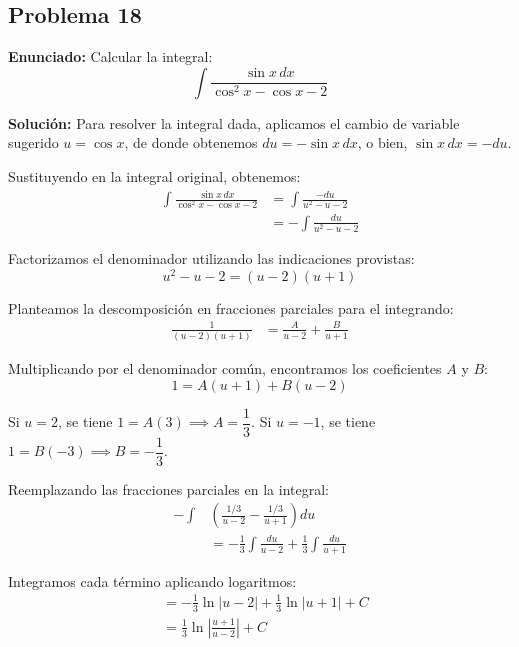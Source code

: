 \subsection*{Problema 18}
\textbf{Enunciado:} Calcular la integral:
\begin{equation*}
\int \frac{\sin x \, dx}{\cos^2 x - \cos x - 2}
\end{equation*}

\textbf{Solución:} Para resolver la integral dada, 
aplicamos el cambio de variable sugerido 
$u = \cos x$, de donde obtenemos 
$du = -\sin x \, dx$, o bien, 
$\sin x \, dx = -du$.

Sustituyendo en la integral original, 
obtenemos:
\begin{align*}
\int \frac{\sin x \, dx}{\cos^2 x - \cos x - 2} 
&= \int \frac{-du}{u^2 - u - 2} \\
&= -\int \frac{du}{u^2 - u - 2}
\end{align*}

Factorizamos el denominador utilizando las 
indicaciones provistas:
\begin{equation*}
u^2 - u - 2 = (u - 2)(u + 1)
\end{equation*}

Planteamos la descomposición en fracciones 
parciales para el integrando:
\begin{align*}
\frac{1}{(u - 2)(u + 1)} 
&= \frac{A}{u - 2} + \frac{B}{u + 1}
\end{align*}

Multiplicando por el denominador común, 
encontramos los coeficientes $A$ y $B$:
\begin{equation*}
1 = A(u + 1) + B(u - 2)
\end{equation*}

Si $u = 2$, se tiene $1 = A(3) \implies A = \dfrac{1}{3}$.
Si $u = -1$, se tiene $1 = B(-3) \implies B = -\dfrac{1}{3}$.

Reemplazando las fracciones parciales en 
la integral:
\begin{align*}
-\int &\left( \frac{1/3}{u - 2} - \frac{1/3}{u + 1} \right) du \\
&= -\frac{1}{3} \int \frac{du}{u - 2} 
+ \frac{1}{3} \int \frac{du}{u + 1}
\end{align*}

Integramos cada término aplicando logaritmos:
\begin{align*}
&= -\frac{1}{3} \ln|u - 2| + \frac{1}{3} \ln|u + 1| + C \\
&= \frac{1}{3} \ln\left| \frac{u + 1}{u - 2} \right| + C
\end{align*}

